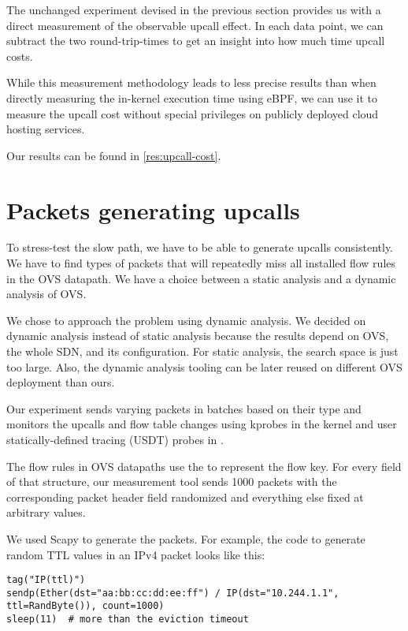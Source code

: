 The unchanged experiment devised in the previous section provides us with a direct measurement of the observable upcall effect. In each data point, we can subtract the two round-trip-times to get an insight into how much time upcall costs.

While this measurement methodology leads to less precise results than when directly measuring the in-kernel execution time using eBPF, we can use it to measure the upcall cost without special privileges on publicly deployed cloud hosting services.

Our results can be found in \cref{res:upcall-cost}.

\section{Packets generating upcalls}
\label{design:upcall-generators}

To stress-test the slow path, we have to be able to generate upcalls consistently. We have to find types of packets that will repeatedly miss all installed flow rules in the OVS datapath. We have a choice between a static analysis and a dynamic analysis of OVS.

We chose to approach the problem using dynamic analysis. We decided on dynamic analysis instead of static analysis because the results depend on OVS, the whole SDN, and its configuration. For static analysis, the search space is just too large. Also, the dynamic analysis tooling can be later reused on different OVS deployment than ours.

Our experiment sends varying packets in batches based on their type and monitors the upcalls and flow table changes using kprobes in the kernel and user statically-defined tracing (USDT) probes in .

The flow rules in OVS datapaths use the  to represent the flow key. For every field of that structure, our measurement tool sends 1000 packets with the corresponding packet header field randomized and everything else fixed at arbitrary values.

We used Scapy to generate the packets. For example, the code to generate random TTL values in an IPv4 packet looks like this:

\begin{verbatim}
tag("IP(ttl)")
sendp(Ether(dst="aa:bb:cc:dd:ee:ff") / IP(dst="10.244.1.1", ttl=RandByte()), count=1000)
sleep(11)  # more than the eviction timeout
\end{verbatim}

